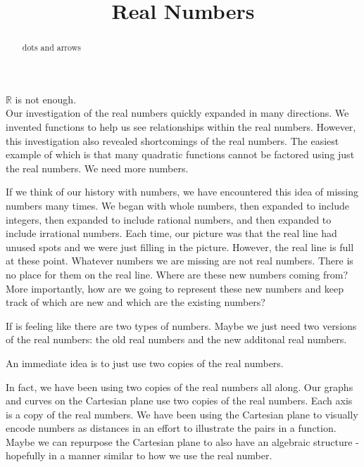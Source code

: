 \documentclass{ximera}
\title{Real Numbers}
\begin{document}
\begin{abstract}
dots and arrows
\end{abstract}
\maketitle



\textbf{$\mathbb{R}$} is not enough.  \\



Our investigation of the real numbers quickly expanded in many directions. We invented functions to help us see relationships within the real numbers.  However, this investigation also revealed shortcomings of the real numbers. The easiest example of which is that many quadratic functions cannot be factored using just the real numbers. We need more numbers.


If we think of our history with numbers, we have encountered this idea of missing numbers many times.  We began with whole numbers, then expanded to include integers, then expanded to include rational numbers, and then expanded to include irrational numbers.  Each time, our picture was that the real line had unused spots and we were just filling in the picture.  However, the real line is full at these point. Whatever numbers we are missing are not real numbers.  There is no place for them on the real line.  Where are these new numbers coming from? More importantly, how are we going to represent these new numbers and keep track of which are new and which are the existing numbers?

If is feeling like there are two types of numbers. Maybe we just need two versions of the real numbers: the old real numbers and the new additonal real numbers.





\begin{center}
An immediate idea is to just use two copies of the real numbers.
\end{center}


In fact, we have been using two copies of the real numbers all along. Our graphs and curves on the Cartesian plane use two copies of the real numbers.  Each axis is a copy of the real numbers. We have been using the Cartesian plane to visually encode numbers as distances in an effort to illustrate the pairs in a function. Maybe we can repurpose the Cartesian plane to also have an algebraic structure - hopefully in a manner similar to how we use the real number. \\
\end{document}
